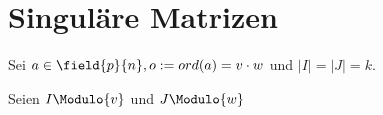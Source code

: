 \section{Singuläre Matrizen}

\begin{satz}
    Sei $a \in \field{p}{n}, o := ord(a) = v\cdot w$ und $|I|=|J| = k$. 

    Seien $I \Modulo{v}$ und $J \Modulo{w}$
\end{satz}